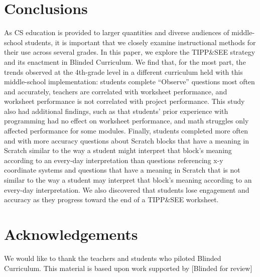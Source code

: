 \documentclass[sigconf,manuscript,review,anonymous]{acmart} %
\def\ts{TIPP\&SEE}
\def\umc{Use\begin{math}\rightarrow\end{math}Modify\begin{math}\rightarrow\end{math}Create\ }
\newcommand{\hide}[1]{}
\newcommand{\Scratchencore}[0]{Blinded Curriculum}
\begin{document}
\section{Conclusions}
\label{sec:conclusions}
As CS education is provided to larger quantities and diverse audiences of middle-school students, it is important that we closely examine instructional methods for their use across several grades. In this paper, we explore the \ts{} strategy and its enactment in \Scratchencore. We find that, for the most part, the trends observed at the 4th-grade level in a different curriculum held with this middle-school implementation: students complete ``Observe'' questions most often and accurately, teachers are correlated with worksheet performance, and worksheet performance is not correlated with project performance. This study also had additional findings, such as that students' prior experience with programming had no effect on worksheet performance, and math struggles only affected performance for some modules. Finally, students completed more often and with more accuracy questions about Scratch blocks that have a meaning in Scratch similar to the way a student might interpret that block's meaning according to an every-day interpretation than questions referencing x-y coordinate systems and questions that have a meaning in Scratch that is not similar to the way a student may interpret that block's meaning according to an every-day interpretation. We also discovered that students lose engagement and accuracy as they progress toward the end of a \ts{} worksheet. %


\section{Acknowledgements}
\label{sec:ack}
We would like to thank the teachers and students who piloted \Scratchencore{}. This material is based upon work supported by [Blinded for review] %
\hide{}


\balance


\end{document}
